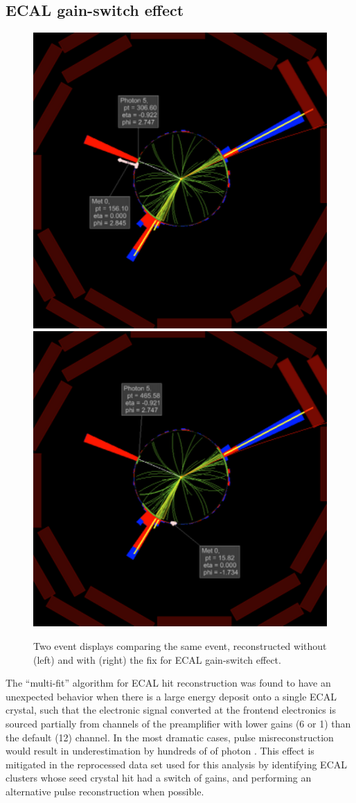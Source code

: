 \subsection{ECAL gain-switch effect}
\label{sec:gainswitch}

\begin{figure}[htbp]
  \centering
  \includegraphics[width=0.48\linewidth]{Reconstruction/Figures/gsfix/evdisp_before.pdf}
  \includegraphics[width=0.48\linewidth]{Reconstruction/Figures/gsfix/evdisp_after.pdf}
  \caption{
    Two event displays comparing the same event, reconstructed without (left) and with (right) the fix for ECAL gain-switch effect.
  }
  \label{fig:eventdisplay_gsfix}
\end{figure}

The ``multi-fit'' algorithm for ECAL hit reconstruction was found to have an unexpected behavior when there is a large energy deposit onto a single ECAL crystal, such that the electronic signal converted at the frontend electronics is sourced partially from channels of the preamplifier with lower gains (6 or 1) than the default (12) channel. 
In the most dramatic cases, pulse misreconstruction would result in underestimation by hundreds of \GeV of photon \pt. 
This effect is mitigated in the reprocessed data set used for this analysis by identifying ECAL clusters whose seed crystal hit had a switch of gains, and performing an alternative pulse reconstruction when possible.


